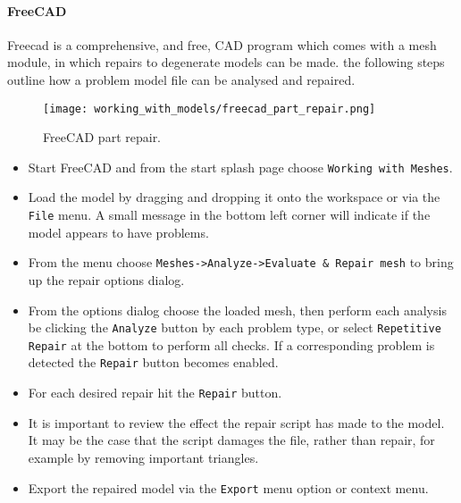 \paragraph{FreeCAD} %
\label{par:freecad}
Freecad is a comprehensive, and free, CAD program which comes with a mesh module, in which repairs to degenerate models can be made.  the following steps outline how a problem model file can be analysed and repaired.

\begin{figure}[H]
\centering
\texttt{[image: working\_with\_models/freecad\_part\_repair.png]}
\caption{FreeCAD part repair.}
\label{fig:freecad_part_repair}
\end{figure}

\begin{itemize}
	\item Start FreeCAD and from the start splash page choose \texttt{Working with Meshes}.  
	\item Load the model by dragging and dropping it onto the workspace or via the \texttt{File} menu.  A small message in the bottom left corner will indicate if the model appears to have problems.
	\item From the menu choose \texttt{Meshes->Analyze->Evaluate \& Repair mesh} to bring up the repair options dialog.
	\item From the options dialog choose the loaded mesh, then perform each analysis be clicking the \texttt{Analyze} button by each problem type, or select \texttt{Repetitive Repair} at the bottom to perform all checks.  If a corresponding problem is detected the \texttt{Repair} button becomes enabled.
	\item For each desired repair hit the \texttt{Repair} button.  
	\item It is important to review the effect the repair script has made to the model.  It may be the case that the script damages the file, rather than repair, for example by removing important triangles.
	\item Export the repaired model via the \texttt{Export} menu option or context menu.
\end{itemize}

